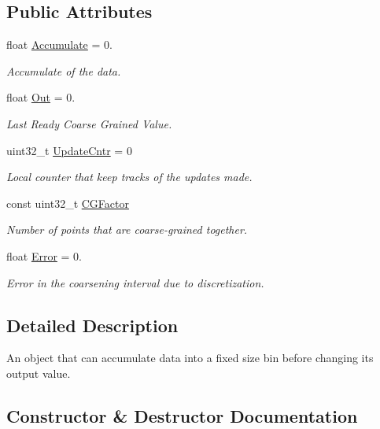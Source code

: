 \subsection*{Public Attributes}
\begin{DoxyCompactItemize}
\item 
float \hyperlink{classRTCoarseGrainer_a7912b13e79da3e88b1ea1c4067be7e08}{Accumulate} = 0.
\begin{DoxyCompactList}\small\item\em Accumulate of the data. \end{DoxyCompactList}\item 
float \hyperlink{classRTCoarseGrainer_a341ec4b52b5f79b15102fc1641a93b8f}{Out} = 0.
\begin{DoxyCompactList}\small\item\em Last Ready Coarse Grained Value. \end{DoxyCompactList}\item 
uint32\+\_\+t \hyperlink{classRTCoarseGrainer_aea262e8f08584c79ac097e8d57dfa909}{Update\+Cntr} = 0
\begin{DoxyCompactList}\small\item\em Local counter that keep tracks of the updates made. \end{DoxyCompactList}\item 
const uint32\+\_\+t \hyperlink{classRTCoarseGrainer_a99dc7fa0624717d9ec0a3b1786dfb89a}{C\+G\+Factor}
\begin{DoxyCompactList}\small\item\em Number of points that are coarse-\/grained together. \end{DoxyCompactList}\item 
float \hyperlink{classRTCoarseGrainer_a80a8cf362112f12a0f7acbeabf2477b2}{Error} = 0.
\begin{DoxyCompactList}\small\item\em Error in the coarsening interval due to discretization. \end{DoxyCompactList}\end{DoxyCompactItemize}


\subsection{Detailed Description}
An object that can accumulate data into a fixed size bin before changing its output value. 

\subsection{Constructor \& Destructor Documentation}
\mbox{\label{classRTCoarseGrainer_a67187c9ba3d8142c23379392dec4e35d}} 
